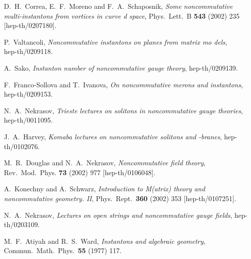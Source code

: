 \documentclass[a4paper,11pt,english]{article}
\numberwithin{equation}{section}
\renewcommand{\=}{\ =\ }
\begin{document}
\begin{thebibliography}{99}
         D.~H.~Correa, E.~F.~Moreno and F.~A.~Schaposnik,
         {\em Some noncommutative multi-instantons from vortices in curve%
d space},
         Phys.\ Lett.\ B {\bf 543} (2002) 235
         [hep-th/0207180].

         P.~Valtancoli,
         {\em Noncommutative instantons on \coordHE{} planes from matrix mo%
dels},\\
         hep-th/0209118.

         A.~Sako,
         {\em Instanton number of noncommutative \coordHE{} gauge theory},
         hep-th/0209139.

         F.~Franco-Sollova and T.~Ivanova,
         {\em On noncommutative merons and instantons},\\
         hep-th/0209153.

         N.~A.~Nekrasov,
         {\em Trieste lectures on solitons in noncommutative gauge theories},\\
         hep-th/0011095.

         J.~A.~Harvey,
         {\em Komaba lectures on noncommutative solitons and \coordHE{}-branes},
         hep-th/0102076.

         M.~R.~Douglas and N.~A.~Nekrasov,
         {\em Noncommutative field theory},\\
         Rev.\ Mod.\ Phys.  {\bf 73} (2002) 977
         [hep-th/0106048].

         A.~Konechny and A.~Schwarz,
         {\em Introduction to M(atrix) theory and noncommutative geometry. II},
         Phys.\ Rept.\  {\bf 360} (2002) 353
         [hep-th/0107251].

         N.~A.~Nekrasov,
         {\em Lectures on open strings and noncommutative gauge fields},
         hep-th/0203109.

         M.~F.~Atiyah and R.~S.~Ward,
         {\em Instantons and algebraic geometry},\\
         Commun.\ Math.\ Phys.\  {\bf 55} (1977) 117.


\end{thebibliography}
\end{document}
